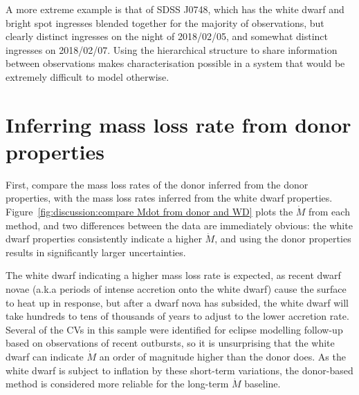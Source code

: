 A more extreme example is that of SDSS J0748, which has the white dwarf and bright spot ingresses blended together for the majority of observations, but clearly distinct ingresses on the night of 2018/02/05, and somewhat distinct ingresses on 2018/02/07.
Using the hierarchical structure to share information between observations makes characterisation possible in a system that would be extremely difficult to model otherwise.



\section{Inferring mass loss rate from donor properties}
\label{sect:discussion:evolutionary modelling}

First, compare the mass loss rates of the donor inferred from the donor properties, with the mass loss rates inferred from the white dwarf properties. Figure~\ref{fig:discussion:compare Mdot from donor and WD} plots the $\dot M$ from each method, and two differences between the data are immediately obvious: the white dwarf properties consistently indicate a higher $\dot M$, and using the donor properties results in significantly larger uncertainties.

The white dwarf indicating a higher mass loss rate is expected, as recent dwarf novae (a.k.a periods of intense accretion onto the white dwarf) cause the surface to heat up in response, but after a dwarf nova has subsided, the white dwarf will take hundreds to tens of thousands of years to adjust to the lower accretion rate.
Several of the CVs in this sample were identified for eclipse modelling follow-up based on observations of recent outbursts, so it is unsurprising that the white dwarf can indicate $\dot M$ an order of magnitude higher than the donor does. As the white dwarf is subject to inflation by these short-term variations, the donor-based method is considered more reliable for the long-term $\dot M$ baseline.

